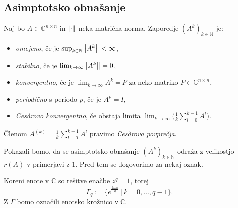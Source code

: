 \documentclass[mat1]{fmfdelo}
\newcommand{\N}{\mathbb N}
\newcommand{\C}{\mathbb C}
\begin{document}
\subsection{Asimptotsko obnašanje}
\begin{definicija}\label{definicijaAsimptotika}
    Naj bo $A \in \C^{n\times n}$ in $\norm{\cdot}$ neka matrična norma. Zaporedje $(A^k)_{k\in\N}$ je:
    \begin{itemize}
        \item \emph{omejeno}, če je $\sup_{k\in \N} \norm{A^k} < \infty$,
        \item \emph{stabilno}, če je $\lim_{k \rightarrow \infty} \norm{A^k} = 0$,
        \item \emph{konvergentno}, če je $\lim_{k \rightarrow \infty} A^k = P$ za neko matriko $P \in \C^{n \times n}$,
        \item \emph{periodično} s periodo $p$, če je $A^p = I$,
        \item \emph{Ces\`arovo konvergentno}, če obstaja limita $\lim_{k \rightarrow \infty} \Big(\frac{1}{k}\sum_{l=0}^{k-1} A^l\Big)$.
    \end{itemize}
    Členom $A^{(k)} = \frac{1}{k}\sum_{l=0}^{k-1} A^l$ pravimo \emph{Ces\`arova povprečja}.
\end{definicija}
Pokazali bomo, da se asimptotsko obnašanje $(A^k)_{k\in\N}$ odraža z velikostjo $r(A)$ v primerjavi z $1$. Pred tem se dogovorimo za nekaj oznak.

Koreni enote v $\C$ so rešitve enačbe $z^q = 1$, torej
\begin{equation*}
    \Gamma_q := \{e^{\frac{2 k \pi i}{q}}\ |\ k = 0, \ldots, q - 1\}.
\end{equation*}
Z $\Gamma$ bomo označili enotsko krožnico v $\C$.
\end{document}
